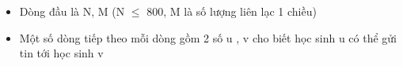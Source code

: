 \begin{itemize}
	\item Dòng đầu là N, M (N  $\le$  800, M là số lượng liên lạc 1 chiều)
	\item Một số dòng tiếp theo mỗi dòng gồm 2 số u , v cho biết học sinh u có thể gửi tin tới học sinh v
\end{itemize}